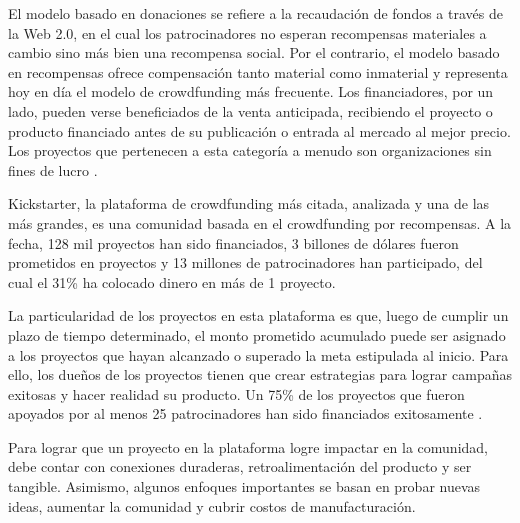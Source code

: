 El modelo basado en donaciones se refiere a la recaudación de fondos a través de la Web 2.0, en el cual los patrocinadores no esperan recompensas materiales a cambio sino más bien una recompensa social. Por el contrario, el modelo basado en recompensas ofrece compensación tanto material como inmaterial y representa hoy en día el modelo de crowdfunding más frecuente. Los financiadores, por un lado, pueden verse beneficiados de la venta anticipada, recibiendo el proyecto o producto financiado antes de su publicación o entrada al mercado al mejor precio. Los proyectos que pertenecen a esta categoría a menudo son organizaciones sin fines de lucro \parencite{cr_kraus2016crowdfunding_strategies}.

Kickstarter, la plataforma de crowdfunding más citada, analizada y una de las más grandes, es una comunidad basada en el crowdfunding por recompensas. A la fecha, 128 mil proyectos han sido financiados, 3 billones de dólares fueron prometidos en proyectos y 13 millones de patrocinadores han participado, del cual el 31\% ha colocado dinero en más de 1 proyecto.

La particularidad de los proyectos en esta plataforma es que, luego de cumplir un plazo de tiempo determinado, el monto prometido acumulado puede ser asignado a los proyectos que hayan alcanzado o superado la meta estipulada al inicio. Para ello, los dueños de los proyectos tienen que crear estrategias para lograr campañas exitosas y hacer realidad su producto. Un 75\% de los proyectos que fueron apoyados por al menos 25 patrocinadores han sido financiados exitosamente \parencite{cr_kickstarter_learn}.

Para lograr que un proyecto en la plataforma logre impactar en la comunidad, debe contar con conexiones duraderas, retroalimentación del producto y ser tangible. Asimismo, algunos enfoques importantes se basan en probar nuevas ideas, aumentar la comunidad y cubrir costos de manufacturación.

